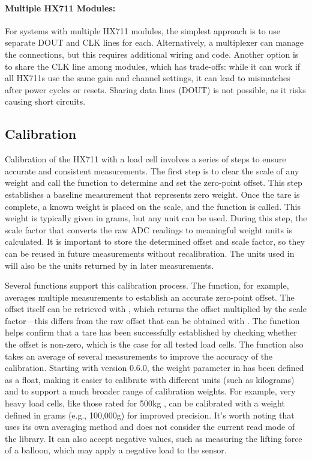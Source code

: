 \paragraph{Multiple HX711 Modules:}
For systems with multiple HX711 modules, the simplest approach is to use separate DOUT and CLK lines for each. Alternatively, a multiplexer can manage the connections, but this requires additional wiring and code. Another option is to share the CLK line among modules, which has trade-offs: while it can work if all HX711s use the same gain and channel settings, it can lead to mismatches after power cycles or resets. Sharing data lines (DOUT) is not possible, as it risks causing short circuits.

\subsection{Calibration}
Calibration of the HX711 with a load cell involves a series of steps to ensure accurate and consistent measurements. The first step is to clear the scale of any weight and call the  function to determine and set the zero-point offset. This step establishes a baseline measurement that represents zero weight. Once the tare is complete, a known weight is placed on the scale, and the  function is called. This weight is typically given in grams, but any unit can be used. During this step, the scale factor that converts the raw ADC readings to meaningful weight units is calculated. It is important to store the determined offset and scale factor, so they can be reused in future measurements without recalibration. The units used in  will also be the units returned by  in later measurements.

Several functions support this calibration process. The  function, for example, averages multiple measurements to establish an accurate zero-point offset. The offset itself can be retrieved with , which returns the offset multiplied by the scale factor—this differs from the raw offset that can be obtained with . The  function helps confirm that a tare has been successfully established by checking whether the offset is non-zero, which is the case for all tested load cells. The  function also takes an average of several measurements to improve the accuracy of the calibration. Starting with version 0.6.0, the weight parameter in  has been defined as a float, making it easier to calibrate with different units (such as kilograms) and to support a much broader range of calibration weights. For example, very heavy load cells, like those rated for 500kg , can be calibrated with a weight defined in grams (e.g., 100,000g) for improved precision. It’s worth noting that  uses its own averaging method and does not consider the current read mode of the library. It can also accept negative values, such as measuring the lifting force of a balloon, which may apply a negative load to the sensor. 


